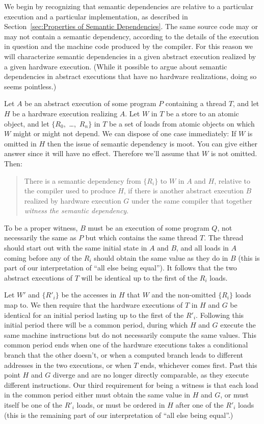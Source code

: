 \documentclass[10]{article}
\begin{document}
We begin by recognizing that semantic dependencies are relative to a
particular execution and a particular implementation,
as described in Section~\ref{sec:Properties of Semantic Dependencies}.
The same source code may or may not contain a semantic dependency,
according to the details of the execution in question and the
machine code produced by the compiler.
For this reason we will characterize semantic dependencies in a given
abstract execution realized by a given hardware execution.
(While it possible to argue about semantic dependencies in abstract
executions that have no hardware realizations, doing so seems pointless.)

Let $A$ be an abstract execution of some program $P$ containing a
thread $T$, and let $H$ be a hardware execution realizing $A$.
Let $W$ in $T$ be a store to an atomic object, and let $\{R_0,$
\ldots,~$R_n\}$ in $T$ be a set of loads from atomic objects on which
$W$ might or might not depend.
We can dispose of one case immediately: If $W$ is omitted in $H$ then
the issue of semantic dependency is moot.
You can give either answer since it will have no effect.
Therefore we'll assume that $W$ is not omitted.
Then:
\begin{quote}
There is a semantic dependency from $\{R_i\}$ to $W$ in $A$ and $H$,
relative to the compiler used to produce $H$, if there is another
abstract execution $B$ realized by hardware execution $G$ under the
same compiler that together \emph{witness the semantic dependency}.
\end{quote}

To be a proper witness, $B$ must be an execution of some program $Q$,
not necessarily the same as $P$ but which contains the same thread $T$.
The thread should start out with the same initial state in $A$ and
$B$, and all loads in $A$ coming before any of the $R_i$ should obtain
the same value as they do in $B$ (this is part of our interpretation
of ``all else being equal'').
It follows that the two abstract executions of $T$ will be identical
up to the first of the $R_i$ loads.

Let $W'$ and $\{R'_i\}$ be the accesses in $H$ that $W$ and the
non-omitted $\{R_i\}$ loads map to.
We then require that the hardware executions of $T$ in $H$ and $G$ be
identical for an initial period lasting up to the first of the $R'_i$.
Following this initial period there will be a common period, during
which $H$ and $G$ execute the same machine instructions but do not
necessarily compute the same values.
This common period ends when one of the hardware executions
takes a conditional branch that the other doesn't, or when a computed
branch leads to different addresses in the two executions, or when $T$
ends, whichever comes first.
Past this point $H$ and $G$ diverge and are no longer directly
comparable, as they execute different instructions.
Our third requirement for being a witness is that each load in the
common period either must obtain the same value in $H$ and $G$, or
must itself be one of the $R'_i$ loads, or must be ordered in $H$
after one of the $R'_i$ loads (this is the remaining part of our
interpretation of ``all else being equal''.)
\end{document}

